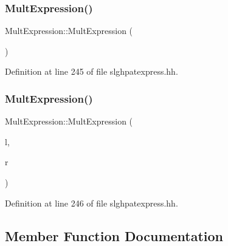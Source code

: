 \subsubsection{\texorpdfstring{MultExpression()}{MultExpression()}\hspace{0.1cm}{\footnotesize\ttfamily [1/2]}}
{\footnotesize\ttfamily Mult\+Expression\+::\+Mult\+Expression (\begin{DoxyParamCaption}\item[{void}]{ }\end{DoxyParamCaption})\hspace{0.3cm}{\ttfamily [inline]}}



Definition at line 245 of file slghpatexpress.\+hh.

\mbox{\label{class_mult_expression_a09975a44b26c041b2ea64c367b5f4e43}} 
\subsubsection{\texorpdfstring{MultExpression()}{MultExpression()}\hspace{0.1cm}{\footnotesize\ttfamily [2/2]}}
{\footnotesize\ttfamily Mult\+Expression\+::\+Mult\+Expression (\begin{DoxyParamCaption}\item[{\mbox{\hyperlink{class_pattern_expression}{Pattern\+Expression}} $\ast$}]{l,  }\item[{\mbox{\hyperlink{class_pattern_expression}{Pattern\+Expression}} $\ast$}]{r }\end{DoxyParamCaption})\hspace{0.3cm}{\ttfamily [inline]}}



Definition at line 246 of file slghpatexpress.\+hh.



\subsection{Member Function Documentation}
\mbox{\label{class_mult_expression_ae435f0944f0ee57367618a778e341735}} 
